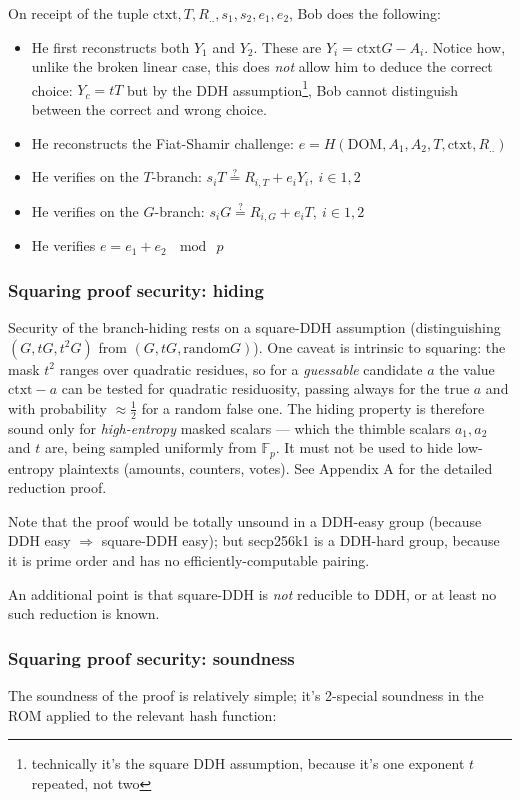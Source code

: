 \documentclass[11pt]{article}
\begin{document}
On receipt of the tuple $\textrm{ctxt}, T, R_{..}, s_1, s_2, e_1, e_2$, Bob does the following:

\begin{itemize}
\item He first reconstructs both $Y_1$ and $Y_2$. These are $Y_i = \textrm{ctxt}G - A_i$. Notice how, unlike the broken linear case, this does \emph{not} allow him to deduce the correct choice: $Y_c = tT$ but by the DDH assumption\footnote{technically it's the square DDH assumption, because it's one exponent $t$ repeated, not two}, Bob cannot distinguish between the correct and wrong choice.
\item He reconstructs the Fiat-Shamir challenge: $e = H(\textrm{DOM}, A_1, A_2, T, \textrm{ctxt}, R_{..})$
\item He verifies on the $T$-branch: $s_i T \stackrel{?}{=} R_{i,T} + e_i Y_i,\ i \in 1,2$
\item He verifies on the $G$-branch: $s_i G \stackrel{?}{=} R_{i,G} + e_i T,\ i \in 1,2$
\item He verifies $e = e_1 + e_2\ \mod\ p$
\end{itemize}

\subsubsection{Squaring proof security: hiding}
Security of the branch-hiding rests on a square-DDH assumption (distinguishing $(G,tG,t^2G)$ from $(G, tG, \textrm{random}G)$). One caveat is intrinsic to squaring: the mask $t^2$ ranges over quadratic residues, so for a \emph{guessable} candidate $a$ the value $\textrm{ctxt}-a$ can be tested for quadratic residuosity, passing always for the true $a$ and with probability $\approx\tfrac12$ for a random false one. The hiding property is therefore sound only for \emph{high-entropy} masked scalars --- which the thimble scalars $a_1,a_2$ and $t$ are, being sampled uniformly from $\mathbb{F}_p$. It must not be used to hide low-entropy plaintexts (amounts, counters, votes). See Appendix A for the detailed reduction proof.

Note that the proof would be totally unsound in a DDH-easy group (because DDH easy $\Rightarrow$ square-DDH easy); but secp256k1 is a DDH-hard group, because it is prime order and has no efficiently-computable pairing.

An additional point is that square-DDH is \emph{not} reducible to DDH, or at least no such reduction is known.

\subsubsection{Squaring proof security: soundness}
The soundness of the proof is relatively simple; it's 2-special soundness in the ROM applied to the relevant hash function:
\end{document}
